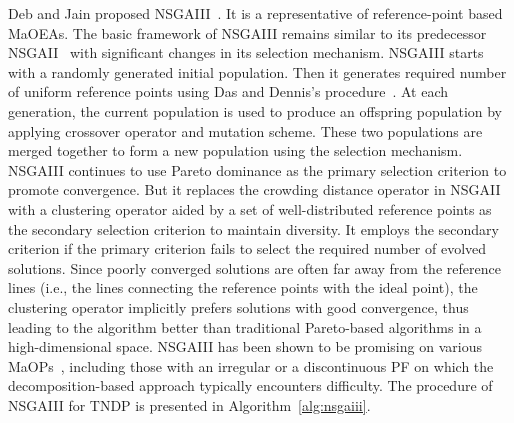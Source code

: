 Deb and Jain proposed NSGAIII~\cite{deb2014evolutionary}. It is a representative of reference-point based MaOEAs. The basic framework of NSGAIII remains similar to its predecessor NSGAII~\cite{deb2002fast} with significant changes in its selection mechanism. NSGAIII starts with a randomly generated initial population. Then it generates required number of uniform reference points using Das and Dennis's procedure~\cite{das1998normal}.  At each generation, the current population is used to produce an offspring population by applying crossover operator and mutation scheme. These two populations are merged together to form a new population using the selection mechanism. NSGAIII continues to use Pareto dominance as the primary selection criterion to promote convergence. But it replaces the crowding distance operator in NSGAII with a clustering operator aided by a set of well-distributed reference points as the secondary selection criterion to maintain diversity. It employs the secondary criterion if the primary criterion fails to select the required number of evolved solutions. Since poorly converged solutions are often far away from the reference lines (i.e., the lines connecting the reference points with the ideal point), the clustering operator implicitly prefers solutions with good convergence, thus leading to the algorithm better than traditional Pareto-based algorithms in a high-dimensional space. NSGAIII has been shown to be promising on various MaOPs~\cite{deb2014evolutionary}, including those with an irregular or a discontinuous PF on which the decomposition-based approach typically encounters difficulty. The procedure of NSGAIII for TNDP is presented in Algorithm~\ref{alg:nsgaiii}.


